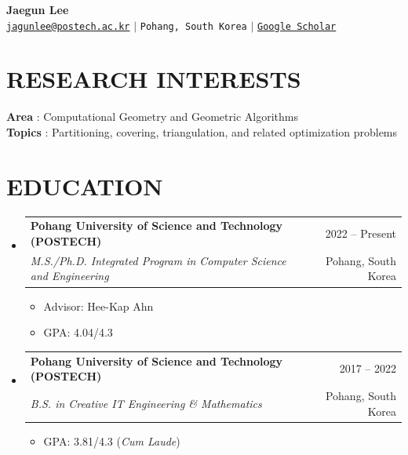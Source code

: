 \documentclass[letterpaper,11pt]{article}
\makeatletter
\newcommand{\resumeItem}[1]{
  \item\small{{#1 \vspace{-1pt}}}
}
\newcommand{\resumeSubheading}[4]{
  \vspace{-1pt}\item
    \begin{tabular*}{\textwidth}[t]{l@{\extracolsep{\fill}}r}
      \textbf{#1} & {\color{dark-grey}\small #2}\vspace{1pt}\\
      \textit{#3} & {\color{dark-grey} \small #4}\\
    \end{tabular*}\vspace{-4pt}
}
\newcommand{\resumeSubHeadingListStart}{\begin{itemize}[leftmargin=0in, label={}]}
\newcommand{\resumeSubHeadingListEnd}{\end{itemize}}
\newcommand{\resumeItemListStart}{\begin{itemize}[leftmargin=1.2em]}
\newcommand{\resumeItemListEnd}{\end{itemize}\vspace{0pt}}
\makeatother
\begin{document}
\begin{center}
    \textbf{\Huge Jaegun Lee} \\ \vspace{5pt}
    \small \faEnvelope \hspace{2pt} \href{mailto:jagunlee@postech.ac.kr}{\texttt{jagunlee@postech.ac.kr}} \hspace{1pt} $|$
    \hspace{1pt} \faMapMarker* \hspace{2pt}\texttt{Pohang, South Korea} \hspace{1pt} $|$
    \hspace{1pt} \href{https://scholar.google.co.kr/citations?hl=en&user=FCnNJhUAAAAJ}{\texttt{Google Scholar}}
    \\ \vspace{-3pt}
\end{center}

\section{RESEARCH INTERESTS}
\begin{itemize}[leftmargin=0in, label={}]
  \small{\item{
    \textbf{Area} {: Computational Geometry and Geometric Algorithms} \\
    \textbf{Topics} {: Partitioning, covering, triangulation, and related optimization problems}
  }}
\end{itemize}

\section{EDUCATION}
\resumeSubHeadingListStart

\resumeSubheading
  {Pohang University of Science and Technology (POSTECH)}{2022 -- Present}
  {M.S./Ph.D. Integrated Program in Computer Science and Engineering}{Pohang, South Korea}
  \resumeItemListStart
    \resumeItem{Advisor: Hee-Kap Ahn}
    \resumeItem{GPA: 4.04/4.3}
  \resumeItemListEnd

\resumeSubheading
  {Pohang University of Science and Technology (POSTECH)}{2017 -- 2022}
  {B.S. in Creative IT Engineering \& Mathematics}{Pohang, South Korea}
  \resumeItemListStart
    \resumeItem{GPA: 3.81/4.3 (\textit{Cum Laude})}
  \resumeItemListEnd

\resumeSubHeadingListEnd
\end{document}
